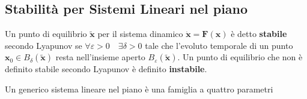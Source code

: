 \subsection{Stabilit\`{a} per Sistemi Lineari nel piano}

\begin{definition}
	Un punto di equilibrio $\tilde{\bm{x}}$ per il sistema dinamico $\bm{\dot{x}} = \bm{F}(\bm{x})$ \`{e} detto \textbf{stabile} secondo Lyapunov se $\forall \varepsilon > 0 \quad \exists \delta >0$  tale che l'evoluto temporale di un punto $\bm{x}_0 \in B_{\delta}(\bm{\tilde{x}})$ resta nell'insieme aperto $B_{\varepsilon}(\bm{\tilde{x}})$. Un punto di equilibrio che non \`{e} definito stabile secondo Lyapunov \`{e} definito \textbf{instabile}. 
\end{definition}

\noindent Un generico sistema lineare nel piano \`{e} una famiglia a quattro parametri 

